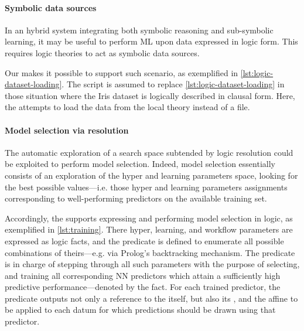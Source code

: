 \documentclass[12pt,a4paper,openright,twoside]{book}
\begin{document}
\paragraph{Symbolic data sources}


In an hybrid system integrating both symbolic reasoning and sub-symbolic learning, it may be useful to perform ML upon data expressed in logic form.
%
This requires logic theories to act as symbolic data sources.

Our \mllib{} makes it possible to support such scenario, as exemplified in \cref{lst:logic-dataset-loading}.
%
The script is assumed to replace \cref{lst:logic-dataset-loading} in those situation where the Iris dataset is logically described in clausal form.
%
Here, the  attempts to load the data from the local theory instead of a file.

\paragraph{Model selection via resolution}



The automatic exploration of a search space subtended by logic resolution could be exploited to perform model selection.
%
Indeed, model selection essentially consists of an exploration of the hyper and learning parameters space, looking for the best possible values---i.e. those hyper and learning parameters assignments corresponding to well-performing predictors on the available training set.

Accordingly, the \mllib{} supports expressing and performing model selection in logic, as exemplified in \cref{lst:training}.
%
There hyper, learning, and workflow parameters are expressed as logic facts, and the  predicate is defined to enumerate all possible combinations of theirs---e.g. via Prolog's backtracking mechanism.
%
The  predicate is in charge of stepping through all such parameters with the purpose of selecting, and training all corresponding NN predictors which attain a sufficiently high predictive performance---denoted by the  fact.
%
For each trained predictor, the predicate outputs not only a reference to the  itself, but also its , and the affine  to be applied to each datum for which predictions should be drawn using that predictor.
\end{document}
